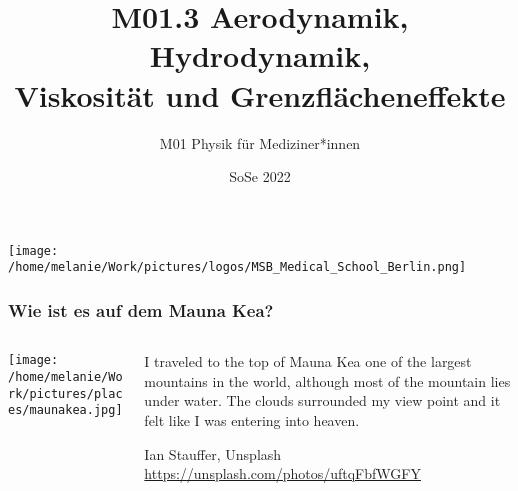 \documentclass{beamer}
\title[M01.3 Flüssigkeiten und Gase]{M01.3 Aerodynamik, Hydrodynamik, \\ Viskosität und Grenzflächeneffekte}
\author[melanie.stefan@medicalschool-berlin.de]{M01 Physik für Mediziner*innen}
\institute[]{Prof. Melanie Stefan - melanie.stefan@medcialschool-berlin.de}
\date{SoSe 2022}
\begin{document}
 
\begin{frame}

 \maketitle 

 
\vfill

\texttt{[image: /home/melanie/Work/pictures/logos/MSB\_Medical\_School\_Berlin.png]}

\end{frame} 

\begin{frame}
\frametitle{Wie ist es auf dem Mauna Kea?}

\begin{columns}[c]

\begin{column}{5cm}

\begin{center}

\texttt{[image: /home/melanie/Work/pictures/places/maunakea.jpg]}

\end{center}

\end{column}

\begin{column}{5cm}


\epigraph{I traveled to the top of Mauna Kea one of the largest mountains in the world, although most of the mountain lies under water. The clouds surrounded my view point and it felt like I was entering into heaven.}{Ian Stauffer, Unsplash\\ \url{https://unsplash.com/photos/uftqFbfWGFY}}


\end{column}

\end{columns}

\end{frame}
\end{document}
